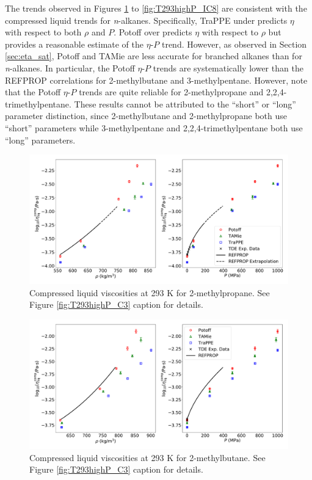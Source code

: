 \documentclass[preprint,review,12pt]{elsarticle}
\begin{document}
   The trends observed in Figures \ref{fig:T293highP_IC4} to \ref{fig:T293highP_IC8} are consistent with the compressed liquid trends for \textit{n}-alkanes. Specifically, TraPPE under predicts $\eta$ with respect to both $\rho$ and $P$. Potoff over predicts $\eta$ with respect to $\rho$ but provides a reasonable estimate of the $\eta$-$P$ trend. However, as observed in Section \ref{sec:eta_sat}, Potoff and TAMie are less accurate for branched alkanes than for \textit{n}-alkanes. In particular, the Potoff $\eta$-$P$ trends are systematically lower than the REFPROP correlations for 2-methylbutane and 3-methylpentane. However, note that the Potoff $\eta$-$P$ trends are quite reliable for 2-methylpropane and 2,2,4-trimethylpentane. These results cannot be attributed to the ``short'' or ``long'' parameter distinction, since 2-methylbutane and 2-methylpropane both use ``short'' parameters while 3-methylpentane and 2,2,4-trimethylpentane both use ``long'' parameters. 
	
	\begin{figure}[htb!]
		\centering
		\includegraphics[width=6.4in]{compare_REFPROP_T293highP_IC4H10.pdf}
		\caption{Compressed liquid viscosities at 293 K for 2-methylpropane. See Figure \ref{fig:T293highP_C3} caption for details.}
		\label{fig:T293highP_IC4}
	\end{figure} 
	
	\begin{figure}[htb!]
		\centering
		\includegraphics[width=6.4in]{compare_REFPROP_T293highP_IC5H12.pdf}
		\caption{Compressed liquid viscosities at 293 K for 2-methylbutane. See Figure \ref{fig:T293highP_C3} caption for details.}
		\label{fig:T293highP_IC5}
	\end{figure} 
	
\end{document}
